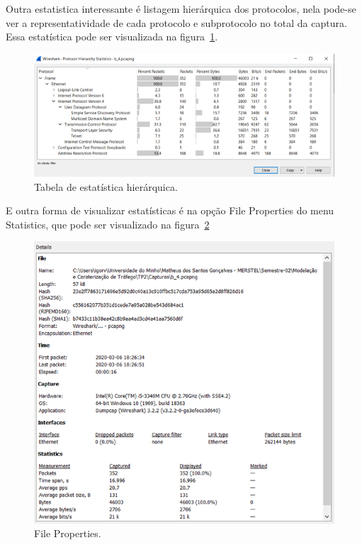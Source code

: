 \documentclass{llncs}
\begin{document}
\begin{flushleft}
  \par Outra estatistica interessante é listagem hierárquica dos protocolos, nela pode-se ver a representatividade de cada protocolo e subprotocolo no total da captura. Essa estatística pode ser visualizada na figura~\ref{fig:statistic}.
  \begin{figure}[h]
    \includegraphics[scale=0.65]{statistic.png}
    \centering
    \caption{Tabela de estatística hierárquica.}
    \label{fig:statistic}
  \end{figure}
\end{flushleft}

\begin{flushleft}
  \par E outra forma de visualizar estatísticas é na opção File Properties do menu Statistics, que pode ser visualizado na figura~\ref{fig:details}
  \begin{figure}[h]
    \includegraphics[scale=0.65]{details.png}
    \centering
    \caption{File Properties.}
    \label{fig:details}
  \end{figure}
\end{flushleft}
\end{document}
